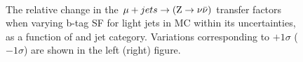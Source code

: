 \begin{figure}[!h]
  \centering
   ~~
  \\

  \caption{\label{fig:tfSyst_bsfl_muToZinv} The relative change in the
  $\mu + jets \rightarrow ({\text Z} \rightarrow \nu\bar{\nu})$ transfer
  factors when varying b-tag SF for light jets in MC within its uncertainties, as a function of \scalht and jet category. 
  Variations corresponding to $+1\sigma$ ($-1\sigma$) are shown in the left (right) figure. 
  }
\end{figure}

